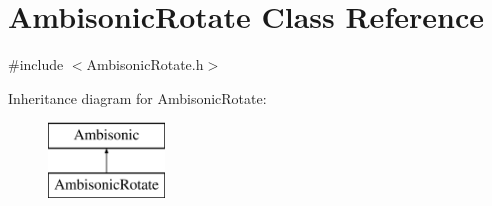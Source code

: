 \hypertarget{class_ambisonic_rotate}{\section{Ambisonic\-Rotate Class Reference}
\label{class_ambisonic_rotate}
}


{\ttfamily \#include $<$Ambisonic\-Rotate.\-h$>$}

Inheritance diagram for Ambisonic\-Rotate\-:\begin{figure}[H]
\begin{center}
\leavevmode
\includegraphics[height=2.000000cm]{class_ambisonic_rotate}
\end{center}
\end{figure}
